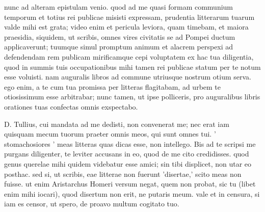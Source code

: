  nunc ad alteram epistulam venio. quod ad me quasi formam communium temporum et totius rei publicae misisti expressam, prudentia litterarum tuarum valde mihi est grata; video enim et pericula leviora, quam timebam, et maiora praesidia, siquidem, ut scribis, omnes vires civitatis se ad Pompei ductum applicaverunt; tuumque simul promptum animum et alacrem perspexi ad defendendam rem publicam mirificamque cepi voluptatem ex hac tua diligentia, quod in summis tuis occupationibus mihi tamen rei publicae statum per te notum esse voluisti. nam auguralis libros ad commune utriusque nostrum otium serva. ego enim, a te cum tua promissa per litteras flagitabam, ad urbem te otiosissimum esse arbitrabar; nunc tamen, ut ipse polliceris, pro auguralibus libris orationes tuas confectas omnis exspectabo.

 D. Tullius, cui mandata ad me dedisti, non convenerat me; nec erat iam quisquam mecum tuorum praeter omnis meos, qui sunt omnes tui. ' stomachosiores ' meas litteras quas dicas esse, non intellego. Bis ad te scripsi me purgans diligenter, te leviter accusans in eo, quod de me cito credidisses. quod genus querelae mihi quidem videbatur esse amici; sin tibi displicet, non utar eo posthac. sed si, ut scribis, eae litterae non fuerunt 'disertae,' scito meas non fuisse. ut enim Aristarchus Homeri versum negat, quem non probat, sic tu (libet enim mihi iocari), quod disertum non erit, ne putaris meum. vale et in censura, si iam es censor, ut spero, de proavo multum cogitato tuo.
